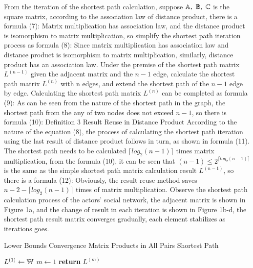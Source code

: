 \documentclass[review]{cvpr}
\begin{document}
From the iteration of the shortest path calculation, suppose \(\Bbb A,\ \Bbb B,\ \Bbb C\) is the square matrix, according to the association law of distance product, there is a formula (7):
Matrix multiplication has association law, and the distance product is isomorphism to matrix multiplication, so simplify the shortest path iteration process as formula (8):
Since matrix multiplication has association law and distance product is isomorphism to matrix multiplication, similarly, distance product has an association law.
Under the premise of the shortest path matrix $L^{(n-1)}$ given the adjacent matrix and the $n-1$ edge, calculate the shortest path matrix $L^{(n)}$ with n edges, and extend the shortest path of the $n-1$ edge by edge.
Calculating the shortest path matrix $L^{(n)}$ can be completed as formula (9):
As can be seen from the nature of the shortest path in the graph, the shortest path from the any of two nodes does not exceed $n-1$, so there is formula (10):
Definition 3 Result Reuse in Distance Product According to the nature of the equation (8), the process of calculating the shortest path iteration using the last result of distance product follows in turn, as shown in formula (11).
The shortest path needs to be calculated $\lceil{log_2(n-1)}\rceil$ times matrix multiplication, from the formula (10), it can be seen that $(n-1)\leq2^{\lceil{log_2(n-1)}\rceil}$ is the same as the simple shortest path matrix calculation result $L^{(n-1)}$, so there is a formula (12):
Obviously, the result reuse method saves $n-2-\lceil{log_2(n-1)}\rceil$ times of matrix multiplication.
Observe the shortest path calculation process of the actors' social network, the adjacent matrix is shown in Figure 1a, and the change of result in each iteration is shown in Figure 1b-d, the shortest path result matrix converges gradually, each element stabilizes as iterations goes.


\begin{algorithm}
\caption{Lower Bounds Convergence Matrix Products in All Pairs Shortest Path}\label{algorithm}
  $L^{(1)}\leftarrow \Bbb W$\;
  $m\leftarrow 1$\;
  {\bf return} $L^{(m)}$\;
\end{algorithm}
\end{document}
